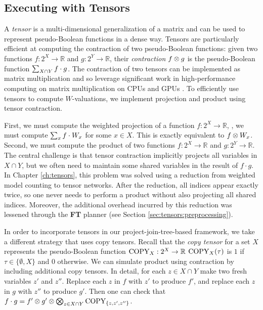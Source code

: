\subsection{Executing with Tensors}

A \emph{tensor} is a multi-dimensional generalization of a matrix and can be used to represent pseudo-Boolean functions in a dense way.
Tensors are particularly efficient at computing the contraction of two pseudo-Boolean functions: given two functions $f: 2^X \to \mathbb{R}$ and $g: 2^Y \to \mathbb{R}$, their \emph{contraction} $f \otimes g$ is the pseudo-Boolean function $\sum_{X \cap Y} f \cdot g$.
The contraction of two tensors can be implemented as matrix multiplication and so leverage significant work in high-performance computing on matrix multiplication on CPUs \cite{LHKK77} and GPUs \cite{FSH04}.
To efficiently use tensors to compute $W$-valuations, we implement projection and product using tensor contraction.

First, we must compute the weighted projection of a function $f: 2^X \to \mathbb{R}$, \ie, we must compute $\sum_x f \cdot W_x$ for some $x \in X$.
This is exactly equivalent to $f \otimes W_x$.
Second, we must compute the product of two functions $f: 2^X \to \mathbb{R}$ and $g: 2^Y \to \mathbb{R}$.
The central challenge is that tensor contraction implicitly projects all variables in $X \cap Y$, but we often need to maintain some shared variables in the result of $f \cdot g$.
In Chapter \ref{ch:tensors}, this problem was solved using a reduction from weighted model counting to tensor networks.
After the reduction, all indices appear exactly twice, so one never needs to perform a product without also projecting all shared indices.
Moreover, the additional overhead incurred by this reduction was lessened through the \textbf{FT} planner (see Section \ref{sec:tensors:preprocessing}).

In order to incorporate tensors in our project-join-tree-based framework, we take a different strategy that uses copy tensors.
Recall that the \emph{copy tensor} for a set $X$ represents the pseudo-Boolean function $\text{COPY}_X: 2^X \to \mathbb{R}$ \st{} $\text{COPY}_X(\tau)$ is $1$ if $\tau \in \{ \emptyset, X \}$ and $0$ otherwise.
We can simulate product using contraction by including additional copy tensors.
In detail, for each $z \in X \cap Y$ make two fresh variables $z'$ and $z''$.
Replace each $z$ in $f$ with $z'$ to produce $f'$, and replace each $z$ in $g$ with $z''$ to produce $g'$.
Then one can check that $f \cdot g = f' \otimes g' \otimes \bigotimes_{z \in X \cap Y} \text{COPY}_{\{z, z', z''\}}$.

